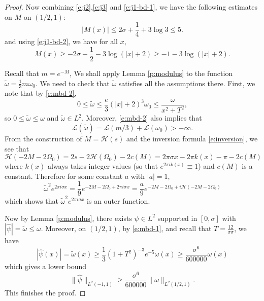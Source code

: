 \documentclass[reqno,12pt,letterpaper]{amsart}
\numberwithin{equation}{section}
\numberwithin{prop}{section}
\begin{document}
\begin{proof}
Now combining \eqref{e:j2},\eqref{e:j3} and \eqref{e:j1-bd-1},
we have the following estimates on $M$ on $(1/2,1)$:
\begin{equation}
\label{e:mbd-1}
|M(x)|\leq 2\sigma+\frac{1}{4}+3\log3\leq 5.
\end{equation}
and using \eqref{e:j1-bd-2}, we have for all $x$,
\begin{equation}
\label{e:mbd-2}
M(x)\geq -2\sigma-\frac{1}{2}-3\log(|x|+2)\geq-1-3\log(|x|+2).
\end{equation}

Recall that $m=e^{-M}$, We shall apply Lemma \ref{p:modulus} to the function $\widetilde{\omega}=\frac{1}{3}m\omega_0$. We need to check that $\widetilde{\omega}$ satisfies all the assumptions there. First, we note that by \eqref{e:mbd-2},
\begin{equation*}
0\leq \widetilde{\omega}\leq\frac{e}{3}(|x|+2)^3\omega_0\leq\frac{\omega}{x^2+T^2},
\end{equation*} 
so $0\leq\widetilde{\omega}\leq\omega$ and $\widetilde{\omega}\in L^2$. Moreover, \eqref{e:mbd-2} also implies that
\begin{equation*}
\mathcal{L}(\widetilde{\omega})=\mathcal{L}(m/3)+\mathcal{L}(\omega_0)>-\infty.
\end{equation*}
From the construction of $M=\mathcal{H}(s)$ and the inversion formula \eqref{e:inversion}, we see that
\begin{equation*}
\mathcal{H}(-2M-2\Omega_0)
=2s-2\mathcal{H}(\Omega_0)-2c(M)
=2\pi\sigma x-2\pi k(x)-\pi-2c(M)
\end{equation*}
where $k(x)$ always takes integer values (so that $e^{2\pi ik(x)}\equiv1$) and $c(M)$ is a constant. Therefore for some constant $a$ with $|a|=1$,
\begin{equation*}
\widetilde{\omega}^2e^{2\pi i\sigma x}=\frac{1}{9}e^{-2M-2\Omega_0+2\pi i\sigma x}=\frac{a}{9}e^{-2M-2\Omega_0+i\mathcal{H}(-2M-2\Omega_0)}
\end{equation*}
which shows that $\widetilde{\omega}^2e^{2\pi i\sigma x}$ is an outer function.

Now by Lemma \ref{p:modulus}, there exists $\psi\in L^2$ supported in $[0,\sigma]$ with $|\widehat{\psi}|=\widetilde{\omega}\leq\omega$. Moreover, on $(1/2,1)$, by \eqref{e:mbd-1}, and recall that $T=\frac{12}{\pi\sigma}$, we have
\begin{equation*}
|\widehat{\psi}(x)|=\widetilde{\omega}(x)\geq \frac{1}{3}(1+T^2)^{-3}e^{-5}\omega(x)
\geq\frac{\sigma^6}{600000}\omega(x)
\end{equation*}
which gives a lower bound
\begin{equation*}
\|\widehat{\psi}\|_{L^2(-1,1)}\geq \frac{\sigma^6}{600000}\|\omega\|_{L^2(1/2,1)}.
\end{equation*}
This finishes the proof.
\end{proof}
\end{document}
